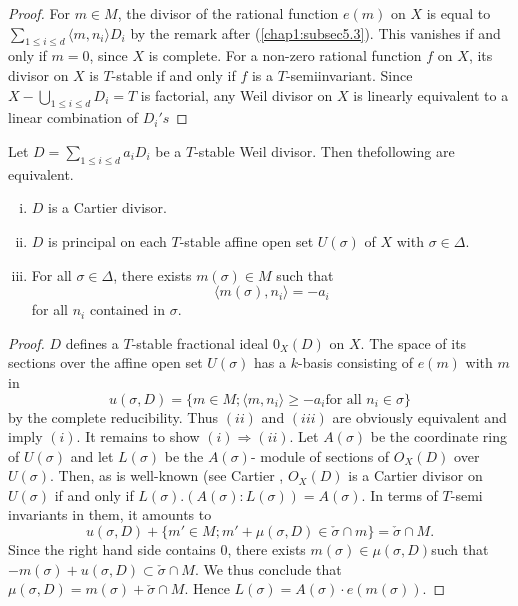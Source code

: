  \begin{proof}
For $m \in M$, the divisor of the rational function $e(m)$ on $X$ is
equal to $\sum\limits_{ 1 \leq i \leq d } \langle m,n_i \rangle D_i$ by the remark
after (\ref{chap1:subsec5.3}). This vanishes if and only if $m=0$, since $X$ is
complete. For a non-zero rational function $f$ on $X$, its divisor on
$X$ is $T$-stable if and only if $f$ is a $T$-semiinvariant. Since $X
-\bigcup \limits_{1 \leq i \leq d} D_i  = T$ is factorial, any Weil
divisor on $X$ is linearly equivalent to a linear combination of
$D_i's$  
 \end{proof} 
 
 \setcounter{lemma}{1}
 \begin{lemma}\label{chap1:lem6.2}%
Let $D = \sum  \limits_{1 \leq i \leq d} a_i D_i  $ be a $T$-stable
Weil divisor. Then the\pageoriginale following are equivalent. 
\begin{enumerate}[(i)]
\item $D$ is a Cartier divisor. 

\item $D$ is principal on each $T$-stable affine open set $U(\sigma) $
  of $X$ with $\sigma \in \Delta$. 

\item For all $\sigma \in \Delta$, there exists $m (\sigma) \in M$ such 
  that  
$$
\langle m(\sigma), n_i \rangle = -a_i
$$
for all $n_i$ contained in $\sigma$.
\end{enumerate}
 \end{lemma} 
 
 \begin{proof}
$D$ defines a $T$-stable fractional ideal $0_X(D)$ on $X$. 
The space of its sections over the affine open set $U(\sigma)$ has a
$k$-basis consisting of $e(m) $ with $m$ in  
$$
u( \sigma,D) = \{ m \in M ; \langle m, n_i \rangle \geq -a_i \text{
  for all } n_i \in \sigma \} 
$$
by the complete reducibility. Thus $(ii)$ and $(iii)$ are obviously
equivalent and imply $(i)$. It remains to show $(i)  \Longrightarrow
(ii)$. 
Let $A(\sigma)$ be the coordinate ring of $U(\sigma)$ and let
$L(\sigma)$ be the $A(\sigma)$- module of sections of $O_X(D)$ over
$U(\sigma)$. Then, as is well-known (see Cartier \cite{keyC1}, $O_X(D)$ is a
Cartier divisor on $U(\sigma)$ if and only if $L(\sigma). (A(\sigma):
L(\sigma)) = A (\sigma)$. In terms of $T$-semi invariants in them, it amounts to  
$$
u(\sigma, D) + \{ m' \in M;m' + \mu(\sigma,D ) \in \check{\sigma} \cap
m \} = \check{\sigma} \cap M. 
$$
Since the right hand side contains 0, there exists $m(\sigma) \in \mu
(\sigma,D)$such that $-m(\sigma) + u (\sigma, D) \subset
\check{\sigma} \cap M$. We thus conclude that $\mu (\sigma, D) = m
(\sigma) + \check{\sigma} \cap M$. Hence $L(\sigma) = A(\sigma) \cdot e
(m(\sigma))$. 
 \end{proof}

